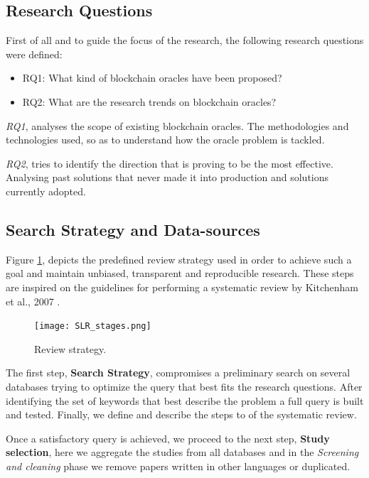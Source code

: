 \subsection{Research Questions}
First of all and to guide the focus of the research, the following research questions were defined:
\begin{itemize}
  \item RQ1:\label{RQ1} What kind of blockchain oracles have been proposed?
  \item RQ2:\label{RQ2} What are the research trends on blockchain oracles?
\end{itemize}

\textit{RQ1}, analyses the scope of existing blockchain oracles. The methodologies and technologies used, so as to understand how the oracle problem is tackled.

\textit{RQ2}, tries to identify the direction that is proving to be the most effective. Analysing past solutions that never made it into production and solutions currently adopted.

\subsection{Search Strategy and Data-sources}
Figure \ref{fig:/figures/SLR_stages}, depicts the predefined review strategy used in order to achieve such a goal and maintain unbiased, transparent and reproducible research. These steps are inspired on the guidelines for performing a systematic review by Kitchenham et al., 2007 \citet{Kitchenham2007}.

\begin{figure}[h]
  \begin{center}
    \leavevmode
    \texttt{[image: SLR\_stages.png]}
    \caption{Review strategy.}
    \label{fig:/figures/SLR_stages}
  \end{center}
\end{figure}

The first step, \textbf{Search Strategy}, compromises a preliminary search on several databases trying to optimize the query that best fits the research questions. After identifying the set of keywords that best describe the problem a full query is built and tested. Finally, we define and describe the steps to of the systematic review.

Once a satisfactory query is achieved, we proceed to the next step, \textbf{Study selection}, here we aggregate the studies from all databases and in the \textit{Screening and cleaning} phase we remove papers written in other languages or duplicated.

